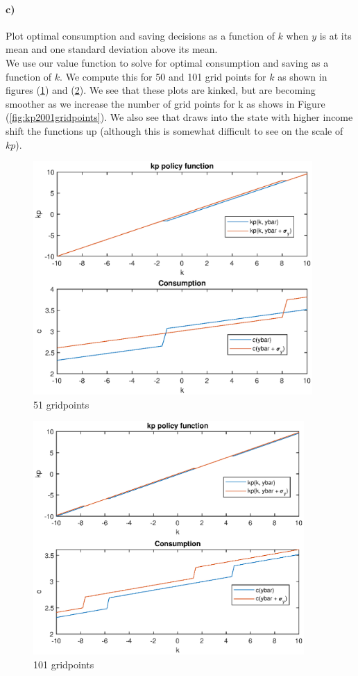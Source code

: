 \documentclass[11pt,letter]{article}
\begin{document}
\paragraph{c)} Plot optimal consumption and saving decisions as a function of $k$ when $y$ is at its mean and one standard deviation above its mean. \\

We use our value function to solve for optimal consumption and saving as a function of $k$. We compute this for 50 and 101 grid points for $k$ as shown in figures (\ref{fig:kp51gridpoints}) and (\ref{fig:kp101gridpoints}). We see that these plots are kinked, but are becoming smoother as we increase the number of grid points for k as shows in Figure (\ref{fig:kp2001gridpoints}). We also see that draws into the state with higher income shift the functions up (although this is somewhat difficult to see on the scale of $kp$).  \\



\begin{figure}[t!]
	\centering
	\includegraphics[height=3.5in]{opt_c_and_kp_51_gridpoints.eps}
	\caption{51 gridpoints}
	\label{fig:kp51gridpoints}
\end{figure}

\begin{figure}[t!]
	\centering
	\includegraphics[height=3.5in]{opt_c_and_kp_101_gridpoints.eps}
	\caption{101 gridpoints}
	\label{fig:kp101gridpoints}
\end{figure}
\end{document}
